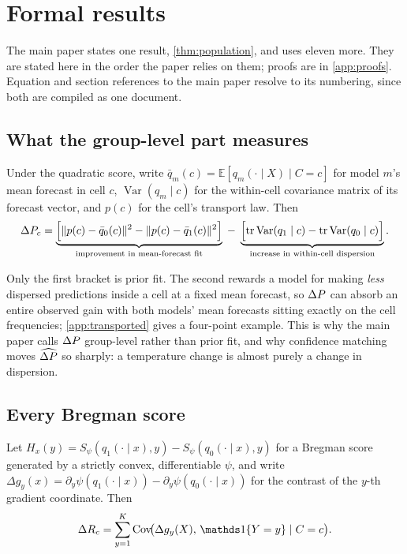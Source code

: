 \section{Formal results}\label{app:formal}

The main paper states one result, \cref{thm:population}, and uses eleven more. They are stated
here in the order the paper relies on them; proofs are in \cref{app:proofs}. Equation and
section references to the main paper resolve to its numbering, since both are compiled as one
document.

\subsection{What the group-level part measures}
\begin{proposition}\label{prop:transported}
Under the quadratic score, write $\bar q_m(c)=\mathbb E[q_m(\cdot\mid X)\mid C=c]$ for
model $m$'s mean forecast in cell $c$, $\operatorname{Var}(q_m\mid c)$ for the
within-cell covariance matrix of its forecast vector, and $p(c)$ for the cell's transport
law. Then
\begin{equation}
\Delta P_c=
\underbrace{\Bigl[\lVert p(c)-\bar q_0(c)\rVert^2-\lVert p(c)-\bar q_1(c)\rVert^2\Bigr]}
_{\text{improvement in mean-forecast fit}}
\;-\;
\underbrace{\Bigl[\operatorname{tr}\operatorname{Var}(q_1\mid c)-
\operatorname{tr}\operatorname{Var}(q_0\mid c)\Bigr]}_{\text{increase in within-cell dispersion}} .
\label{eq:transported-composition}
\end{equation}
\end{proposition}

\noindent Only the first bracket is prior fit. The second rewards a model for making
\emph{less} dispersed predictions inside a cell at a fixed mean forecast, so $\Delta P$ can absorb
an entire observed gain with both models' mean forecasts sitting exactly on the cell
frequencies; \cref{app:transported} gives a four-point example. This is why the main paper
calls $\Delta P$ group-level rather than prior fit, and why confidence matching moves $\widehat{\Delta P}$ so
sharply: a temperature change is almost purely a change in dispersion.

\subsection{Every Bregman score}
\begin{theorem}\label{thm:bregman}
Let $H_x(y)=S_\psi(q_1(\cdot\mid x),y)-S_\psi(q_0(\cdot\mid x),y)$ for a Bregman score generated by a strictly convex, differentiable $\psi$, and write $\Delta g_y(x)=\partial_y\psi(q_1(\cdot\mid x))-\partial_y\psi(q_0(\cdot\mid x))$ for the contrast of the $y$-th gradient coordinate. Then
\begin{equation}
\Delta R_c=\sum_{y=1}^K\operatorname{Cov}\!\bigl(\Delta g_y(X),\,\ind\{Y=y\}\mid C=c\bigr).
\label{eq:bregman-cov-id}
\end{equation}
\end{theorem}

